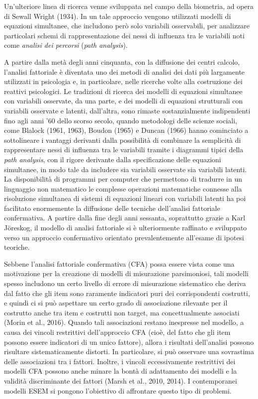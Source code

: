 \documentclass[
  11pt,
]{krantz}
\theoremstyle{definition}
\theoremstyle{definition}
\theoremstyle{definition}
\theoremstyle{definition}
\theoremstyle{remark}
\begin{document}
Un'ulteriore linea di ricerca venne sviluppata nel campo della biometria, ad opera di Sewall Wright (1934). In un tale approccio vengono utilizzati modelli di equazioni simultanee, che includono però solo variabili osservabili, per analizzare particolari schemi di rappresentazione dei nessi di influenza tra le variabili noti come \emph{analisi dei percorsi} (\emph{path analysis}).

A partire dalla metà degli anni cinquanta, con la diffusione dei centri calcolo, l'analisi fattoriale è diventata uno dei metodi di analisi dei dati più largamente utilizzati in psicologia e, in particolare, nelle ricerche volte alla costruzione dei reattivi psicologici. Le tradizioni di ricerca dei modelli di equazioni simultanee con variabili osservate, da una parte, e dei modelli di equazioni strutturali con variabili osservate e latenti, dall'altra, sono rimaste sostanzialmente indipendenti fino agli anni '60 dello scorso secolo, quando metodologi delle scienze sociali, come Blalock (1961, 1963), Boudon (1965) e Duncan (1966) hanno cominciato a sottolineare i vantaggi derivanti dalla possibilità di combinare la semplicità di rappresentare nessi di influenza tra le variabili tramite i diagrammi tipici della \emph{path analysis}, con il rigore derivante dalla specificazione delle equazioni simultanee, in modo tale da includere sia variabili osservate sia variabili latenti. La disponibilità di programmi per computer che permettono di tradurre in un linguaggio non matematico le complesse operazioni matematiche connesse alla risoluzione simultanea di sistemi di equazioni lineari con variabili latenti ha poi facilitato enormemente la diffusione delle tecniche dell'analisi fattoriale confermativa. A partire dalla fine degli anni sessanta, soprattutto grazie a Karl Jöreskog, il modello di analisi fattoriale si è ulteriormente raffinato e sviluppato verso un approccio confermativo orientato prevalentemente all'esame di ipotesi teoriche.

Sebbene l'analisi fattoriale confermativa (CFA) possa essere vista come una motivazione per la creazione di modelli di misurazione parsimoniosi, tali modelli spesso includono un certo livello di errore di misurazione sistematico che deriva dal fatto che gli item sono raramente indicatori puri dei corrispondenti costrutti, e quindi ci si può aspettare un certo grado di associazione rilevante per il costrutto anche tra item e costrutti non target, ma concettualmente associati (Morin et al., 2016). Quando tali associazioni restano inespresse nel modello, a causa dei vincoli restrittivi dell'approccio CFA (cioè, del fatto che gli item possono essere indicatori di un unico fattore), allora i risultati dell'analisi possono risultare sistematicamente distorti. In particolare, si può osservare una sovrastima delle associazioni tra i fattori. Inoltre, i vincoli eccessivamente restrittivi dei modelli CFA possono anche minare la bontà di adattamento dei modelli e la validità discriminante dei fattori (Marsh et al., 2010, 2014). I contemporanei modelli ESEM si pongono l'obiettivo di affrontare questo tipo di problemi.
\end{document}
